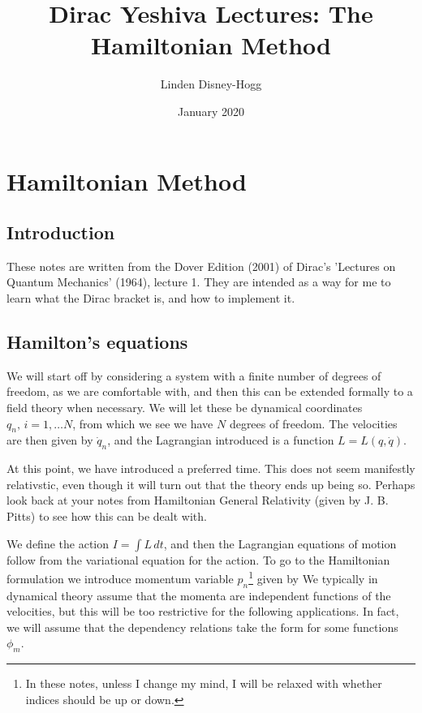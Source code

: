 \documentclass{article}
\title{Dirac Yeshiva Lectures: The Hamiltonian Method}
\author{Linden Disney-Hogg}
\date{January 2020}
\begin{document}
\maketitle
\tableofcontents

\section{Hamiltonian Method}
\subsection{Introduction}
These notes are written from the Dover Edition (2001) of Dirac's 'Lectures on Quantum Mechanics' (1964), lecture 1. They are intended as a way for me to learn what the Dirac bracket is, and how to implement it.
\subsection{Hamilton's equations}
We will start off by considering a system with a finite number of degrees of freedom, as we are comfortable with, and then this can be extended formally to a field theory when necessary. We will let these be dynamical coordinates $q_n, \, i=1, \dots N$, from which we see we have $N$ degrees of freedom. The velocities are then given by $\dot{q}_n$, and the Lagrangian introduced is a function $L = L(q,\dot{q})$. 

\begin{remark}
At this point, we have introduced a preferred time. This does not seem manifestly relativstic, even though it will turn out that the theory ends up being so. Perhaps look back at your notes from Hamiltonian General Relativity (given by J. B. Pitts) to see how this can be dealt with. 
\end{remark}

We define the action $I = \int L \, dt $, and then the Lagrangian equations of motion 
follow from the variational equation for the action. To go to the Hamiltonian formulation we introduce momentum variable $p_n$\footnote{In these notes, unless I change my mind, I will be relaxed with whether indices should be up or down.} given by 
We typically in dynamical theory assume that the momenta are independent functions of the velocities, but this will be too restrictive for the following applications. In fact, we will assume that the dependency relations take the form 
for some functions $\phi_m$. 
\end{document}
